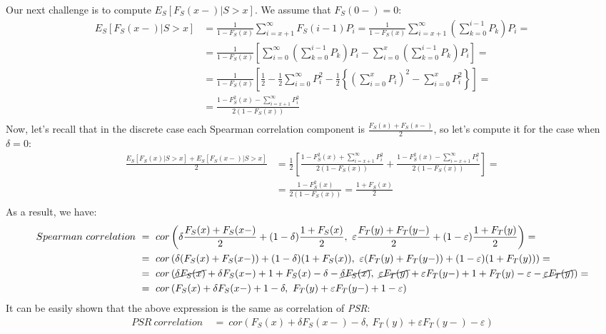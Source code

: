 \documentclass[]{article}
\let\epsilon\varepsilon
\begin{document}
Our next challenge is to compute $E_S[F_S(x-)|S>x]$. We assume that $F_S(0-)=0$:
	$$
	\begin{aligned}
		E_S[F_S(x-)|S>x] &= \frac{1}{1-F_S(x)} \sum_{i=x+1}^{\infty}F_S(i-1)P_i = \frac{1}{1-F_S(x)}\sum_{i=x+1}^{\infty}\left( \sum_{k=0}^{i-1}P_k \right)P_i =\\
		 &= \frac{1}{1-F_S(x)}\left[ \sum_{i=0}^{\infty}\left( \sum_{k=0}^{i-1}P_k \right)P_i - \sum_{i=0}^{x}\left( \sum_{k=0}^{i-1}P_k \right)P_i   \right] = \\
		 &= \frac{1}{1-F_S(x)}\left[ \frac{1}{2} - \frac{1}{2}\sum_{i=0}^{\infty}P_i^2 -  \frac{1}{2} \left\{ \left(\sum_{i=0}^{x}P_i\right)^2 - \sum_{i=0}^{x}P_i^2  \right\}    \right] = \\
		 &= \frac{ 1 - F_S^2(x) - \sum_{i=x+1}^{\infty}P_i^2 }{2(1-F_S(x))}\\
	\end{aligned}
	$$
Now, let's recall that in the discrete case each Spearman correlation component is $\frac{F_S(s) + F_S(s-)}{2}$, so let's compute it for the case when $\delta=0$:
	$$
	\begin{aligned}
	  \frac{E_S[F_S(x)|S>x] + E_S[F_S(x-)|S>x]}{2} &= \frac{1}{2}\left[\frac{ 1 - F_S^2(x) + \sum_{i=x+1}^{\infty}P_i^2 }{2(1-F_S(x))}   +   \frac{ 1 - F_S^2(x) - \sum_{i=x+1}^{\infty}P_i^2 }{2(1-F_S(x))}\right]=\\
		&= \frac{1 - F_S^2(x)}{2(1-F_S(x))}= \frac{1 + F_S(x)}{2}\\
	\end{aligned}
	$$
As a result, we have:
	$$
	\begin{aligned}
		Spearman~correlation~&=~ cor\left(  \delta\frac{F_S(x) + F_S(x-)}{2} + (1-\delta) \frac{1 + F_S(x)}{2}, ~\epsilon\frac{F_T(y) + F_T(y-)}{2} + (1-\epsilon) \frac{1 + F_T(y)}{2} \right)=\\
		&=~ cor\left(  \delta( F_S(x) + F_S(x-)) + (1-\delta) (1 + F_S(x)), ~\epsilon (F_T(y) + F_T(y-)) + (1-\epsilon) (1 + F_T(y)) \right)=\\
		&=~ cor\left( \cancel{\delta F_S(x)} + \delta F_S(x-) +  1 + F_S(x) -\delta - \cancel{\delta F_S(x)}, ~\cancel{\epsilon F_T(y)} + \epsilon F_T(y-) + 1 + F_T(y)-\epsilon -\cancel{\epsilon F_T(y)}   \right)=\\
		&=~ cor\left( F_S(x) + \delta F_S(x-) +  1 -\delta , ~ F_T(y) + \epsilon F_T(y-) + 1 -\epsilon   \right)\\
	\end{aligned}
	$$
It can be easily shown that the above expression is the same as correlation of \emph{PSR}:
	$$
	\begin{aligned}
		PSR~correlation~&=~ cor\left(  F_S(x) + \delta F_S(x-) -\delta,~F_T(y) + \epsilon F_T(y-) -\epsilon  \right)\\
	\end{aligned}
	$$
\end{document}
